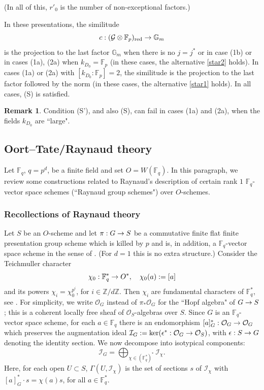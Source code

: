 \documentclass[reqno, 10pt]{amsart}
\makeatletter
\newcommand{\BF}{\ensuremath{\mathbb {F}}\xspace}
\newcommand{\BG}{\ensuremath{\mathbb {G}}\xspace}
\newcommand{\BZ}{\ensuremath{\mathbb {Z}}\xspace}
\newcommand{\CG}{\ensuremath{\mathcal {G}}\xspace}
\newcommand{\CI}{\ensuremath{\mathcal {I}}\xspace}
\newcommand{\CO}{\ensuremath{\mathcal {O}}\xspace}
\newcommand{\red}{\ensuremath{\mathrm{red}}\xspace}
\theoremstyle{definition}
\newtheorem{remark}[subsubsection]{Remark}
\numberwithin{equation}{subsection}
\numberwithin{subsubsection}{subsection}
\renewcommand{\to}{%
   \ifbool{@display}{\longrightarrow}{\rightarrow}%
   }
\makeatother
\begin{document}
(In all of this, $r'_0$ is the number of non-exceptional factors.) 

In these presentations, the similitude 
\[
c: (\CG\otimes\BF_p)_{\red}\to \BG_m
\]
is the projection to the last factor $\BG_m$ when there is no $j=j^*$ or in case (1b) or in cases (1a), (2a) when $k_{D_0}=\BF_p$ (in these cases, the alternative \eqref{star2} holds).  In cases (1a) or (2a) with $[k_{D_0}:\BF_p]=2$, the similitude is the projection to the last factor followed by the norm (in these cases, the alternative \eqref{star1} holds). 
In all cases, (S) is satisfied. 

\begin{remark}
Condition (S'),  and also (S), can fail in cases (1a) and (2a), when the fields $k_{D_0}$ are ``large". 
\end{remark}



 
 
  
   

\subsection{Oort--Tate/Raynaud theory}\label{ss:OTR}
Let $\BF_q$, $q=p^d$, be a finite field and set $O=W(\BF_q)$. In this paragraph, we review some constructions related to Raynaud's description of certain rank $1$ $\BF_q$-vector space schemes (``Raynaud group schemes") over $O$-schemes. 

\subsubsection{Recollections of Raynaud theory} Let $S$ be an $O$-scheme and let $\pi: G\to S$ be a commutative finite flat finite presentation group scheme  which is killed by $p$ and is, in addition, a $\BF_q$-vector space scheme in the sense of \cite[Def. 1.2.1]{Ray}. (For $d=1$ this is no extra structure.) Consider the Teichmuller character
\[
\chi_0: \BF_q^*\to O^*,\quad \chi_0(a):=[a]
\]
 and its powers $\chi_i=\chi_0^{p^i}$, for $i\in \BZ/d\BZ$. Then $\chi_i$ are fundamental characters of $\BF_q^*$, see \cite[Def. 1.1]{Ray}. For simplicity, we write $\CO_G$ instead of $\pi_*\CO_G$ for the   ``Hopf algebra" of $G\to S$; this is  a coherent locally free  sheaf of $\CO_S$-algebras over $S$.
 Since $G$ is an $\BF_q$-vector space scheme, for each $a\in \BF_q$ there is an endomorphism $[a]^*_G: \CO_G\to \CO_G$ which preserves the augmentation ideal $\CI_G:=\ker(\epsilon^*: \CO_G\to \CO_S)$, with $\epsilon: S\to G$ denoting the identity section.
 We now decompose  into isotypical components: 
 \[
 \CI_G=\bigoplus_{\chi \in (\BF^*_q)^*}\CI_\chi.
 \]
Here, for each open $U\subset S$, $\Gamma(U,\CI_\chi)$ is the set of sections $s$ of $\CI_\chi$
 with $[a]^*_G\cdot s=\chi(a)s$, for all $a\in \BF_q^*$. 
 
\end{document}
